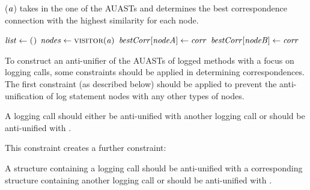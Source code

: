 
\begin{algorithm}
\caption{($\mathit{a}$) takes in the one of the AUASTs and determines the best correspondence connection with the highest similarity for each node.}
\label{alg-determine}
\begin{algorithmic}[1]
\DetermineBest
    \State $\mathit{list} \gets \textsc{()}$
    \State $\mathit{nodes} \gets \textsc{visitor}(\mathit{a})$
			 	\EndFor  	
	   \EndFor	
	   		\State $\mathit{bestCorr}[\mathit{nodeA}] \gets \mathit{corr}$
	   		\State $\mathit{bestCorr}[\mathit{nodeB}] \gets \mathit{corr}$
	   \EndFor
  \end{algorithmic}
\end{algorithm}

To construct an anti-unifier of the AUASTs of logged methods with a focus on logging calls, some constraints should be applied in determining correspondences. The first constraint (as described below) should be applied to prevent the anti-unification of log statement nodes with any other types of nodes.
\begin{constraint}
A logging call should either be anti-unified with another logging call or should be anti-unified with \nothing.
\end{constraint}	
	
This constraint creates a further constraint:

\begin{constraint}
A structure containing a logging call should be anti-unified with a corresponding structure containing another logging call or should be anti-unified with \nothing.
\end{constraint}

